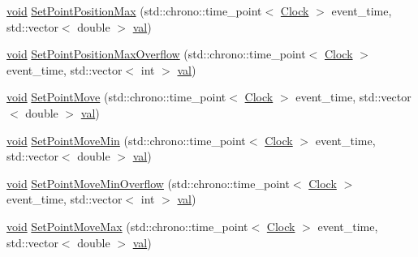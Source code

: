 \begin{DoxyCompactItemize}
\item 
\mbox{\hyperlink{glad_8h_a950fc91edb4504f62f1c577bf4727c29}{void}} \mbox{\hyperlink{class_point_adb2897b1a7bde15e81b72cb59342f186}{Set\+Point\+Position\+Max}} (std\+::chrono\+::time\+\_\+point$<$ \mbox{\hyperlink{universe_8h_a0ef8d951d1ca5ab3cfaf7ab4c7a6fd80}{Clock}} $>$ event\+\_\+time, std\+::vector$<$ double $>$ \mbox{\hyperlink{glad_8h_a26942fd2ed566ef553eae82d2c109c8f}{val}})
\item 
\mbox{\hyperlink{glad_8h_a950fc91edb4504f62f1c577bf4727c29}{void}} \mbox{\hyperlink{class_point_a29aca71cae82195775f3822740df80ec}{Set\+Point\+Position\+Max\+Overflow}} (std\+::chrono\+::time\+\_\+point$<$ \mbox{\hyperlink{universe_8h_a0ef8d951d1ca5ab3cfaf7ab4c7a6fd80}{Clock}} $>$ event\+\_\+time, std\+::vector$<$ int $>$ \mbox{\hyperlink{glad_8h_a26942fd2ed566ef553eae82d2c109c8f}{val}})
\item 
\mbox{\hyperlink{glad_8h_a950fc91edb4504f62f1c577bf4727c29}{void}} \mbox{\hyperlink{class_point_a2cf44d5cf17ecf2b3385bde963678589}{Set\+Point\+Move}} (std\+::chrono\+::time\+\_\+point$<$ \mbox{\hyperlink{universe_8h_a0ef8d951d1ca5ab3cfaf7ab4c7a6fd80}{Clock}} $>$ event\+\_\+time, std\+::vector$<$ double $>$ \mbox{\hyperlink{glad_8h_a26942fd2ed566ef553eae82d2c109c8f}{val}})
\item 
\mbox{\hyperlink{glad_8h_a950fc91edb4504f62f1c577bf4727c29}{void}} \mbox{\hyperlink{class_point_a287698b6f3ec6a610447fded5c3542ca}{Set\+Point\+Move\+Min}} (std\+::chrono\+::time\+\_\+point$<$ \mbox{\hyperlink{universe_8h_a0ef8d951d1ca5ab3cfaf7ab4c7a6fd80}{Clock}} $>$ event\+\_\+time, std\+::vector$<$ double $>$ \mbox{\hyperlink{glad_8h_a26942fd2ed566ef553eae82d2c109c8f}{val}})
\item 
\mbox{\hyperlink{glad_8h_a950fc91edb4504f62f1c577bf4727c29}{void}} \mbox{\hyperlink{class_point_a4a988ff988a3984545cf0c35e764c404}{Set\+Point\+Move\+Min\+Overflow}} (std\+::chrono\+::time\+\_\+point$<$ \mbox{\hyperlink{universe_8h_a0ef8d951d1ca5ab3cfaf7ab4c7a6fd80}{Clock}} $>$ event\+\_\+time, std\+::vector$<$ int $>$ \mbox{\hyperlink{glad_8h_a26942fd2ed566ef553eae82d2c109c8f}{val}})
\item 
\mbox{\hyperlink{glad_8h_a950fc91edb4504f62f1c577bf4727c29}{void}} \mbox{\hyperlink{class_point_afa3c2290a72c99e8892029eaa6676204}{Set\+Point\+Move\+Max}} (std\+::chrono\+::time\+\_\+point$<$ \mbox{\hyperlink{universe_8h_a0ef8d951d1ca5ab3cfaf7ab4c7a6fd80}{Clock}} $>$ event\+\_\+time, std\+::vector$<$ double $>$ \mbox{\hyperlink{glad_8h_a26942fd2ed566ef553eae82d2c109c8f}{val}})
\item 

\end{DoxyCompactItemize}

